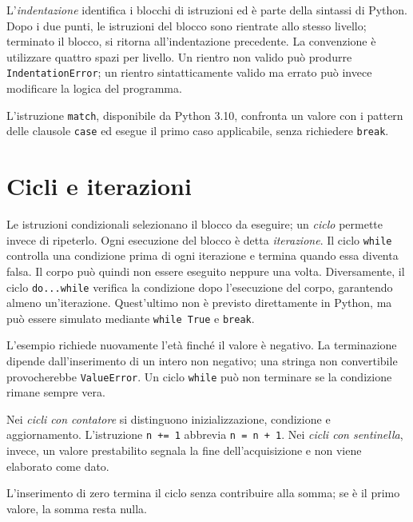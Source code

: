 L'\emph{indentazione} identifica i blocchi di istruzioni ed è parte
della sintassi di Python. Dopo i due punti, le istruzioni del blocco
sono rientrate allo stesso livello; terminato il blocco, si ritorna
all'indentazione precedente. La convenzione è utilizzare quattro spazi
per livello. Un rientro non valido può produrre \texttt{IndentationError};
un rientro sintatticamente valido ma errato può invece modificare la
logica del programma.

L'istruzione \texttt{match}, disponibile da Python 3.10,
confronta un valore con i pattern delle clausole \texttt{case}
ed esegue il primo caso applicabile, senza richiedere \texttt{break}.

\clearpage

\section{Cicli e iterazioni}
\label{sec:fi-python-cicli}

Le istruzioni condizionali selezionano il blocco da eseguire; un
\emph{ciclo} permette invece di ripeterlo. Ogni esecuzione del blocco
è detta \emph{iterazione}. Il ciclo \texttt{while} controlla una condizione
prima di ogni iterazione e termina quando essa diventa falsa. Il corpo
può quindi non essere eseguito neppure una volta. Diversamente, il ciclo
\texttt{do...while} verifica la condizione dopo l'esecuzione del corpo,
garantendo almeno un'iterazione. Quest'ultimo non è previsto direttamente in Python,
ma può essere simulato mediante \texttt{while True} e \texttt{break}.



L'esempio richiede nuovamente l'età finché il valore è negativo. La
terminazione dipende dall'inserimento di un intero non negativo; una
stringa non convertibile provocherebbe \texttt{ValueError}. Un ciclo
\texttt{while} può non terminare se la condizione rimane sempre vera.

Nei \emph{cicli con contatore} si distinguono inizializzazione,
condizione e aggiornamento. L'istruzione \texttt{n += 1} abbrevia
\texttt{n = n + 1}. Nei \emph{cicli con sentinella}, invece, un valore
prestabilito segnala la fine dell'acquisizione e non viene elaborato come
dato.



L'inserimento di zero termina il ciclo senza contribuire alla somma;
se è il primo valore, la somma resta nulla.

